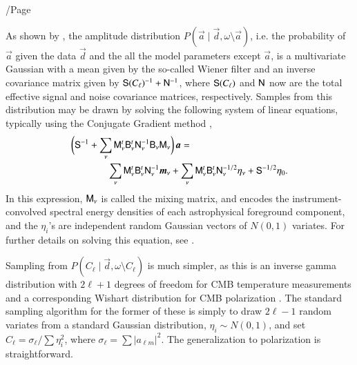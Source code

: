 /Page\documentclass[twocolumn]{aa}
\renewcommand{\d}[0]{\vec{d}}
\renewcommand{\a}[0]{\vec{a}}
\newcommand{\m}[0]{\vec{m}}
\newcommand{\B}[0]{\tens{B}}
\newcommand{\N}[0]{\tens{N}}
\newcommand{\M}[0]{\tens{M}}
\renewcommand{\S}[0]{\tens{S}}
\begin{document}
As shown by \citet{jewell2004,wandelt2004}, the amplitude distribution
$P(\a\mid\d,\omega\setminus\a)$, i.e. the probability of $\a$ given the data $\d$ 
and the all the model parameters except $\a$, is a multivariate Gaussian with a
mean given by the so-called Wiener filter and an inverse covariance
matrix given by $\S(C_{\ell})^{-1}+\N^{-1}$, where $\S(C_{\ell})$ and $\N$ now are the
total effective signal and noise covariance matrices, respectively. Samples from this distribution may be
drawn by solving the following system of linear equations, typically
using the Conjugate Gradient method \citep{shewchuk:1994},
\begin{equation}
  \label{eq:wiener}
  \begin{split}
    \biggl(\S^{-1} + \sum_{\nu}\M^t_{\nu}\B^t_{\nu}&\N_{\nu}^{-1}\B_{\nu}\M_{\nu}\biggr)\,\a = \\
    \sum_\nu\M_\nu^t&\B_{\nu}^t\N_\nu^{-1}\m_{\nu} 
    + \sum_{\nu}\M_{\nu}^t\B_{\nu}^t\N_{\nu}^{-1/2}\eta_{\nu} +
    \S^{-1/2}\eta_{0}.
  \end{split}
\end{equation}
In this expression, $\M_{\nu}$ is called the mixing matrix, and
encodes the instrument-convolved spectral energy densities of each
astrophysical foreground component, and the $\eta_i$'s are independent
random Gaussian vectors of $N(0,1)$ variates. For further details on
solving this equation, see \citet{eriksen2008,seljebotn:2019,bp01,bp11}.

Sampling from $P(C_{\ell}\mid\d,\omega\setminus C_{\ell})$ is much
simpler, as this is an inverse gamma distribution with $2\ell+1$
degrees of freedom for CMB temperature measurements
\citep{wandelt2004} and a corresponding Wishart distribution for CMB
polarization \citep{larson:2006}. The standard sampling algorithm for
the former of these is simply to draw $2\ell-1$ random variates from a
standard Gaussian distribution, $\eta_i\sim N(0,1)$, and set $C_{\ell}
= \sigma_{\ell} / \sum \eta_i^2$, where $\sigma_\ell = \sum |a_{\ell
  m}|^2$. The generalization to polarization is straightforward.
\end{document}
